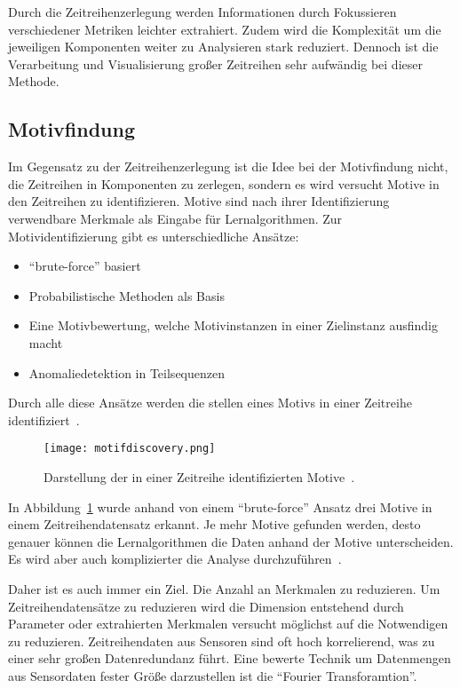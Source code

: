 Durch die Zeitreihenzerlegung werden Informationen durch Fokussieren verschiedener Metriken leichter extrahiert. Zudem wird die Komplexität um die jeweiligen Komponenten weiter zu Analysieren stark reduziert. Dennoch ist die Verarbeitung und Visualisierung großer Zeitreihen sehr aufwändig bei dieser Methode.

\subsection{Motivfindung}
Im Gegensatz zu der Zeitreihenzerlegung ist die Idee bei der Motivfindung nicht, die Zeitreihen in Komponenten zu zerlegen, sondern es wird versucht Motive in den Zeitreihen zu identifizieren.
Motive sind nach ihrer Identifizierung verwendbare Merkmale als Eingabe für Lernalgorithmen. Zur Motividentifizierung gibt es unterschiedliche Ansätze:
\begin{itemize}
  \item \enquote{brute-force} basiert
  \item Probabilistische Methoden als Basis
  \item Eine Motivbewertung, welche Motivinstanzen in einer Zielinstanz ausfindig macht
  \item Anomaliedetektion in Teilsequenzen
\end{itemize}

Durch alle diese Ansätze werden die stellen eines Motivs in einer Zeitreihe identifiziert~\cite{Leonard2018}. 
\begin{figure}
  \centering
  \texttt{[image: motifdiscovery.png]}
  \caption{Darstellung der in einer Zeitreihe identifizierten Motive~\cite{Leonard2018}. }
  \label{fig:motivdiscovery}
\end{figure}

In Abbildung\ \ref{fig:motivdiscovery} wurde anhand von einem \enquote{brute-force} Ansatz drei Motive in einem Zeitreihendatensatz erkannt.
Je mehr Motive gefunden werden, desto genauer können die Lernalgorithmen die Daten anhand der Motive unterscheiden.
Es wird aber auch komplizierter die Analyse durchzuführen~\cite{Leonard2018}.

Daher ist es auch immer ein Ziel. Die Anzahl an Merkmalen zu reduzieren. 
Um Zeitreihendatensätze zu reduzieren wird die Dimension entstehend durch Parameter oder extrahierten Merkmalen versucht möglichst auf die Notwendigen zu reduzieren. Zeitreihendaten aus Sensoren sind oft hoch korrelierend, was zu einer sehr großen Datenredundanz führt. 
Eine bewerte Technik um Datenmengen aus Sensordaten fester Größe darzustellen ist die \enquote{Fourier Transforamtion}. 

